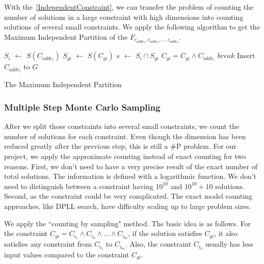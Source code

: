 With the~\ref{IndependentConstraint}, we can transfer the problem of counting the number of 
solutions in a large constraint with high
dimensions into counting solutions of 
several small constraints. We apply the following algorithm to get the Maximum Independent Partition
of the $F_{c_{addr_1},c_{addr_2},...,c_{addr_n}}$.

\IncMargin{1em}
\begin{algorithm}[h]
\DontPrintSemicolon
{}
{
   $S_i$ $\leftarrow$ $S(C_{addr_i})$ \;
   {
   $S_{gi}$ $\leftarrow$ $S(C_{gi})$ \;
   $s$ $\leftarrow$ $S_i \cap S_{gi}$  \;
   {
      $C_{gi} = C_{gi} \land C_{addr_i}$ \;
      $break$ \;
   }
   Insert $C_{{addr}_i}$ to $G$
   }
}
\caption{The Maximum Independent Partition}
\end{algorithm}
\DecMargin{1em}

\subsubsection{Multiple Step Monte Carlo Sampling}

After we split those constraints into several small constraints, we count
the number of solutions for each constraint. Even though the dimension
has been reduced greatly after the previous step, this is still a
\#P problem. For our project, we apply the approximate counting instead of
exact counting for two reasons. First, we don't need to have a very precise
result of the exact number of total solutions. The information is defined with
a logarithmic function. We don't need to distinguish between a constraint having
$10^{10}$ and $10^{10} + 10$ solutions.
Second, as the constraint could be very complicated. The exact model counting
approaches, like DPLL search, have difficulty scaling up to large problem sizes.

We apply the ``counting by sampling" method. The basic idea is as follows.
For the constraint $C_{gi}= C_{i_1} \land C_{i_2} \land ... \land C_{i_m}$, 
if the solution satisfies $C_{gi}$, it also
satisfies any constraint from $C_{i_1}$ to $C_{i_m}$. Also, the constraint
$C_{i_k}$ usually has less input values compared to the constraint $C_{gi}$.



